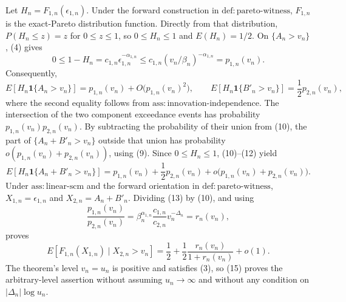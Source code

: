 Let \(H_n=F_{1,n}(\epsilon_{1,n})\). Under the forward construction in \(\mathrm{def{:}pareto\text{-}witness}\), \(F_{1,n}\) is the exact-Pareto distribution function. Directly from that distribution, \(P(H_n\leq z)=z\) for \(0\leq z\leq1\), so \(0\leq H_n\leq1\) and \(E(H_n)=1/2\). On \(\{A_n>v_n\}\), (4) gives
\[
0\leq1-H_n
=c_{1,n}\epsilon_{1,n}^{-\alpha_{1,n}}
\leq c_{1,n}(v_n/\beta_n)^{-\alpha_{1,n}}
=p_{1,n}(v_n).
\tag{11}
\]
Consequently,
\[
E[H_n\mathbf 1\{A_n>v_n\}]
=p_{1,n}(v_n)+O\bigl(p_{1,n}(v_n)^2\bigr),
\qquad
E[H_n\mathbf 1\{B'_n>v_n\}]
=\frac12p_{2,n}(v_n),
\tag{12}
\]
where the second equality follows from \(\mathrm{ass{:}innovation\text{-}independence}\). The intersection of the two component exceedance events has probability \(p_{1,n}(v_n)p_{2,n}(v_n)\). By subtracting the probability of their union from (10), the part of \(\{A_n+B'_n>v_n\}\) outside that union has probability \(o(p_{1,n}(v_n)+p_{2,n}(v_n))\), using (9). Since \(0\leq H_n\leq1\), (10)--(12) yield
\[
E[H_n\mathbf 1\{A_n+B'_n>v_n\}]
=p_{1,n}(v_n)+\frac12p_{2,n}(v_n)
+o\bigl(p_{1,n}(v_n)+p_{2,n}(v_n)\bigr).
\tag{13}
\]
Under \(\mathrm{ass{:}linear\text{-}scm}\) and the forward orientation in \(\mathrm{def{:}pareto\text{-}witness}\), \(X_{1,n}=\epsilon_{1,n}\) and \(X_{2,n}=A_n+B'_n\). Dividing (13) by (10), and using
\[
\frac{p_{1,n}(v_n)}{p_{2,n}(v_n)}
=\beta_n^{\alpha_{1,n}}\frac{c_{1,n}}{c_{2,n}}v_n^{-\Delta_n}
=r_n(v_n),
\tag{14}
\]
proves
\[
E[F_{1,n}(X_{1,n})\mid X_{2,n}>v_n]
=\frac12+\frac12\frac{r_n(v_n)}{1+r_n(v_n)}+o(1).
\tag{15}
\]
The theorem's level \(v_n=u_n\) is positive and satisfies (3), so (15) proves the arbitrary-level assertion without assuming \(u_n\to\infty\) and without any condition on \(|\Delta_n|\log u_n\).

